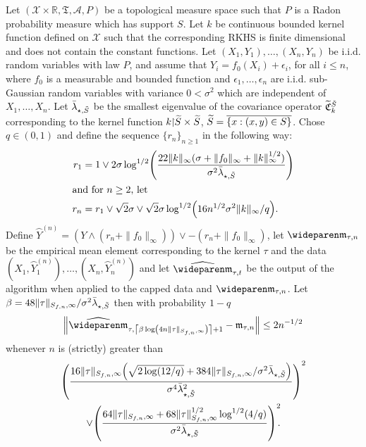 \documentclass[10pt]{amsart}
\theoremstyle{definition}\newtheorem{defi}[theo]{Definition}\newtheorem{rema}[theo]{Remark}\newtheorem{exam}[theo]{Example}\newtheorem{exem}[theo]{Example}\newtheorem{nota}[theo]{Notation}
\theoremstyle{remark}
\newcommand{\restrr}
{\!\!\upharpoonright\!\!}
\newcommand{\R}{\mathbb{R}}
\newcommand{\X}{\mathcal{X}}
\newcommand{\clA}{\mathcal{A}}
\newcommand{\fkC}{\mathfrak{C}}
\newcommand{\fkT}{\mathfrak{T}}
\newcommand{\Cov}{\tilde{\fkC}}
\newcommand{\mean}{\mathfrak{m}}
\newcommand{\wh}{\widehat}
\let\oldtilde\tilde
\renewcommand*{\tilde}[1]{\mathchoice{\widetilde{#1}}{\widetilde{#1}}{\oldtilde{#1}}{\oldtilde{#1}}}
\let\originalleft\left
\let\originalright\right
\renewcommand{\left}{\mathopen{}\mathclose\bgroup\originalleft}
\renewcommand{\right}{\aftergroup\egroup\originalright}
\begin{document}
\begin{prop}\label{prop4.3}
Let $(\X \times \R, \fkT, \clA,P)$ be a topological measure space such that $P$ is a Radon probability measure which has support $S$. Let $k$ be continuous bounded kernel function defined on $\X$ such that the corresponding RKHS is finite dimensional and does not contain the constant functions. Let $(X_1,Y_1), \dots, (X_n,Y_n)$ be i.i.d. random variables with law $P$, and assume that $Y_i = f_0(X_i) + \epsilon_i$, for all $i \leq n$, where $f_0$ is a measurable and bounded function and $\epsilon_1,\dots, \epsilon_n$ are i.i.d. sub-Gaussian random variables with variance $0 < \sigma^2$ which are independent of $X_1,\dots, X_n$. Let $\bar \lambda_{\star,\tilde S}$ be the smallest eigenvalue of the covariance operator $\Cov^{\tilde S}_k$ corresponding to the kernel function $k\restrr \tilde S \times \tilde S$, $\tilde S = \overline{\{x: (x,y) \in S\}}$. Chose $q \in (0,1)$ and define the sequence $\{r_n\}_{n\geq 1}$ in the following way:
\begin{align*}
r_1 &= 1 \vee 2 \sigma \log^{1/2}\left(\frac{22 \|k\|_\infty (\sigma + \|f_0\|_\infty + \|k\|_\infty^{1/2}) }{\sigma^2 \bar \lambda_{\star,\tilde S}}
\right)
\\
\intertext{and for $n\geq 2$, let}
r_n &= r_1 \vee\sqrt{2} \sigma \vee \sqrt{2} \sigma \log^{1/2}\left(16 n^{1/2} \sigma^2 \|k\|_\infty/ q\right).
\end{align*}
Define $\wideparen Y^{(n)} = (Y \wedge (r_n + \|f_0\|_\infty)) \vee - (r_n + \|f_0\|_\infty)$, let $\wideparen \mean_{\tau,n}$ be the empirical mean element corresponding to the kernel $\tau$ and the data $(X_1, \wideparen Y_1^{(n)}), \dots, (X_n, \wideparen Y_n^{(n)})$ and let $\wh{\wideparen \mean}_{\tau,t}$ be the output of the algorithm when applied to the capped data and $\wideparen \mean_{\tau,n}$. Let $\beta = 48 \|\tau \|_{S_{f,n},\infty} /\sigma^2 \bar \lambda_{\star,\tilde S}$ then with probability $1-q$
\[
\left\| \wh{\wideparen \mean}_{\tau,\left\lceil \beta \log\left(4 n \|\tau \|_{S_{f,n},\infty}\right) \right\rceil +1} - \mean_{\tau,n} \right\| \leq 2 n^{-1/2}
\]
whenever $n$ is (strictly) greater than
\begin{multline*}
\left(
\frac{16 \|\tau\|_{S_{f,n},\infty} \left(\sqrt{2\log(12/q)} + 384 \|\tau\|_{S_{f,n},\infty} /\sigma^2 \bar \lambda_{\star,\tilde S}\right)}{
\sigma^4 \bar \lambda^2_{\star, \tilde S}} \right)^2 \\
\vee \left(\frac{64\|\tau\|_{S_{f,n},\infty} + 68 \|\tau\|_{S_{f,n},\infty}^{1/2} \log^{1/2}(4/q)}{\sigma^2 \bar \lambda_{\star,\tilde S}}\right)^{2}\!\!.
\end{multline*}
\end{prop}
\end{document}
